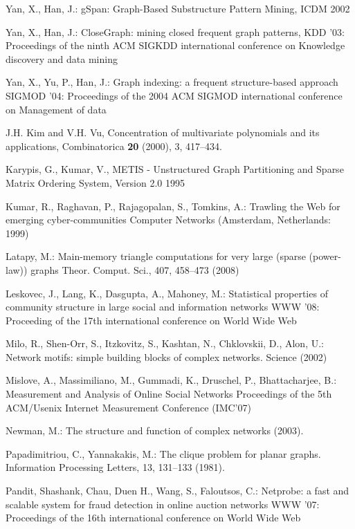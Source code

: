 \documentclass{llncs}
\begin{document}
\begin{thebibliography}{5}
Yan, X., Han, J.:
gSpan: Graph-Based Substructure Pattern Mining,
ICDM 2002

Yan, X., Han, J.:
CloseGraph: mining closed frequent graph patterns,
KDD '03: Proceedings of the ninth ACM SIGKDD international conference on Knowledge discovery and data mining


Yan, X., Yu, P., Han, J.:
Graph indexing: a frequent structure-based approach
SIGMOD '04: Proceedings of the 2004 ACM SIGMOD international conference on Management of data


J.H. Kim and V.H. Vu,
Concentration of multivariate polynomials and its applications,
Combinatorica {\bf 20} (2000), 3, 417--434.


Karypis, G., Kumar, V.,
METIS - Unstructured Graph Partitioning and Sparse Matrix Ordering System, Version 2.0
1995

Kumar, R., Raghavan, P., Rajagopalan, S., Tomkins, A.:
Trawling the Web for emerging cyber-communities
Computer Networks (Amsterdam, Netherlands: 1999)

Latapy, M.:
Main-memory triangle computations for very large (sparse (power-law)) graphs
Theor. Comput. Sci., 407, 458--473 (2008)

Leskovec, J., Lang, K.,  Dasgupta, A., Mahoney, M.:
Statistical properties of community structure in large social and information networks
WWW '08: Proceeding of the 17th international conference on World Wide Web

Milo, R., Shen-Orr, S., Itzkovitz, S., Kashtan, N., Chklovskii, D., Alon, U.:
Network motifs: simple building blocks of complex networks.
Science (2002)

Mislove, A., Massimiliano, M., Gummadi, K., Druschel, P., Bhattacharjee, B.:
Measurement and Analysis of Online Social Networks
Proceedings of the 5th ACM/Usenix Internet Measurement Conference (IMC'07)

Newman, M.:
The structure and function of complex networks (2003).



Papadimitriou, C., Yannakakis, M.:
The clique problem for planar graphs. 
Information Processing Letters, 13, 131--133 (1981).



Pandit, Shashank, Chau, Duen  H., Wang, S., Faloutsos, C.:
Netprobe: a fast and scalable system for fraud detection in online auction networks
WWW '07: Proceedings of the 16th international conference on World Wide Web





\end{thebibliography}
\end{document}
